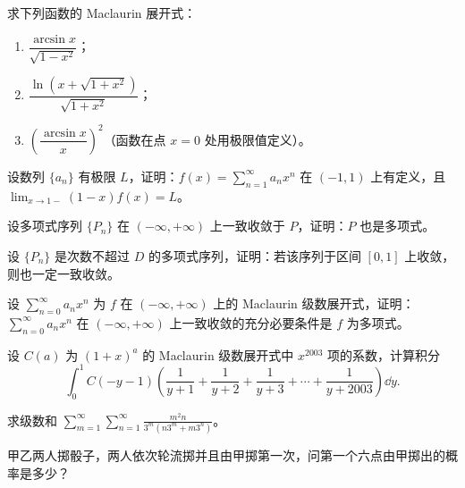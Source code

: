 \begin{xreferenceproblem}[8]
求下列函数的 Maclaurin 展开式：
  \begin{enumerate}[label=(\arabic*)]
    \item $\dfrac{\arcsin x}{\sqrt{1-x^2}}$；
    \item $\dfrac{\ln(x+\sqrt{1+x^2})}{\sqrt{1+x^2}}$；
    \item $\left(\dfrac{\arcsin x}{x}\right)^2$（函数在点 $x=0$ 处用极限值定义）。
  \end{enumerate}
\end{xreferenceproblem}

\begin{xreferenceproblem}[9]
设数列 $\{a_n\}$ 有极限 $L$，证明：$\displaystyle f(x)=\sum_{n=1}^{\infty}a_nx^n$ 在 $(-1,1)$ 上有定义，且 $\displaystyle\lim_{x\to1-}(1-x)f(x)=L$。
\end{xreferenceproblem}

\begin{xreferenceproblem}[10]
设多项式序列 $\{P_n\}$ 在 $(-\infty,+\infty)$ 上一致收敛于 $P$，证明：$P$ 也是多项式。
\end{xreferenceproblem}

\begin{xreferenceproblem}[11]
设 $\{P_n\}$ 是次数不超过 $D$ 的多项式序列，证明：若该序列于区间 $[0,1]$ 上收敛，则也一定一致收敛。
\end{xreferenceproblem}

\begin{xreferenceproblem}[12]
设 $\displaystyle\sum_{n=0}^{\infty}a_nx^n$ 为 $f$ 在 $(-\infty,+\infty)$ 上的 Maclaurin 级数展开式，证明：$\displaystyle\sum_{n=0}^{\infty}a_nx^n$ 在 $(-\infty,+\infty)$ 上一致收敛的充分必要条件是 $f$ 为多项式。
\end{xreferenceproblem}

\begin{xreferenceproblem}[13]
设 $C(a)$ 为 $(1+x)^a$ 的 Maclaurin 级数展开式中 $x^{2003}$ 项的系数，计算积分
  \[
    \int_0^1 C(-y-1)\left(\frac1{y+1}+\frac1{y+2}+\frac1{y+3}+\cdots+\frac1{y+2003}\right)\dd y.
  \]
\end{xreferenceproblem}

\begin{xreferenceproblem}[14]
求级数和 $\displaystyle\sum_{m=1}^{\infty}\sum_{n=1}^{\infty}\frac{m^2n}{3^m(n3^m+m3^n)}$。
\end{xreferenceproblem}

\begin{xreferenceproblem}[15]
甲乙两人掷骰子，两人依次轮流掷并且由甲掷第一次，问第一个六点由甲掷出的概率是多少？
\end{xreferenceproblem}

